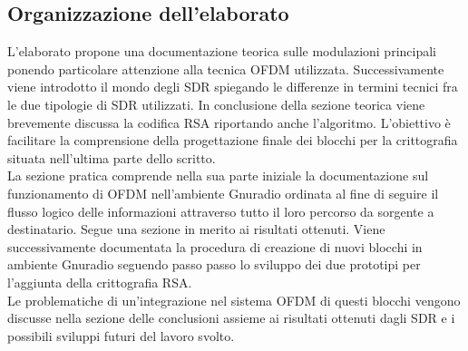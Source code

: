 \subsection{Organizzazione dell'elaborato}L'elaborato propone una documentazione teorica sulle modulazioni principali ponendo particolare attenzione alla tecnica OFDM utilizzata. Successivamente viene introdotto il mondo degli SDR spiegando le differenze in termini tecnici fra le due tipologie di SDR utilizzati. In conclusione della sezione teorica viene brevemente discussa la codifica RSA riportando anche l'algoritmo. L'obiettivo è facilitare la comprensione della progettazione finale dei blocchi per la crittografia situata nell'ultima parte dello scritto.
\\La sezione pratica comprende nella sua parte iniziale la documentazione sul funzionamento di OFDM nell'ambiente Gnuradio ordinata al fine di seguire il flusso logico delle informazioni attraverso tutto il loro percorso da sorgente a destinatario. Segue una sezione in merito ai risultati ottenuti.
Viene successivamente documentata la procedura di creazione di nuovi blocchi in ambiente Gnuradio seguendo passo passo lo sviluppo dei due prototipi per l'aggiunta della crittografia RSA.
\\
Le problematiche di un'integrazione nel sistema OFDM di questi blocchi vengono discusse nella sezione delle conclusioni assieme ai risultati ottenuti dagli SDR e i possibili sviluppi futuri del lavoro svolto.





\newpage



